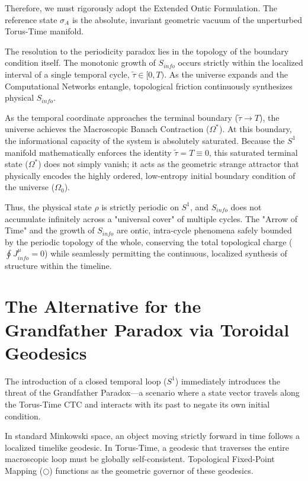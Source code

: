 \documentclass[12pt,openany]{book}
\theoremstyle{plain}
\theoremstyle{definition}
\theoremstyle{remark}
\begin{document}
Therefore, we must rigorously adopt the Extended Ontic Formulation. The reference state $\sigma_A$ is the absolute, invariant geometric vacuum of the unperturbed Torus-Time manifold.

The resolution to the periodicity paradox lies in the topology of the boundary condition itself. The monotonic growth of $S_{info}$ occurs strictly within the localized interval of a single temporal cycle, $\tilde{\tau} \in [0, T)$. As the universe expands and the Computational Networks entangle, topological friction continuously synthesizes physical $S_{info}$.

As the temporal coordinate approaches the terminal boundary ($\tilde{\tau} \to T$), the universe achieves the Macroscopic Banach Contraction ($\Omega^*$). At this boundary, the informational capacity of the system is absolutely saturated. Because the $S^1$ manifold mathematically enforces the identity $\tilde{\tau} = T \equiv 0$, this saturated terminal state ($\Omega^*$) does not simply vanish; it acts as the geometric strange attractor that physically encodes the highly ordered, low-entropy initial boundary condition of the universe ($\Omega_0$). 

Thus, the physical state $\rho$ is strictly periodic on $S^1$, and $S_{info}$ does not accumulate infinitely across a "universal cover" of multiple cycles. The "Arrow of Time" and the growth of $S_{info}$ are ontic, intra-cycle phenomena safely bounded by the periodic topology of the whole, conserving the total topological charge ($\oint J_{info}^\mu = 0$) while seamlessly permitting the continuous, localized synthesis of structure within the timeline.

\section{The Alternative for the Grandfather Paradox via Toroidal Geodesics}

The introduction of a closed temporal loop ($S^1$) immediately introduces the threat of the Grandfather Paradox—a scenario where a state vector travels along the Torus-Time CTC and interacts with its past to negate its own initial condition. 

In standard Minkowski space, an object moving strictly forward in time follows a localized timelike geodesic. In Torus-Time, a geodesic that traverses the entire macroscopic loop must be globally self-consistent. Topological Fixed-Point Mapping ($\bigcirc$) functions as the geometric governor of these geodesics.
\end{document}
